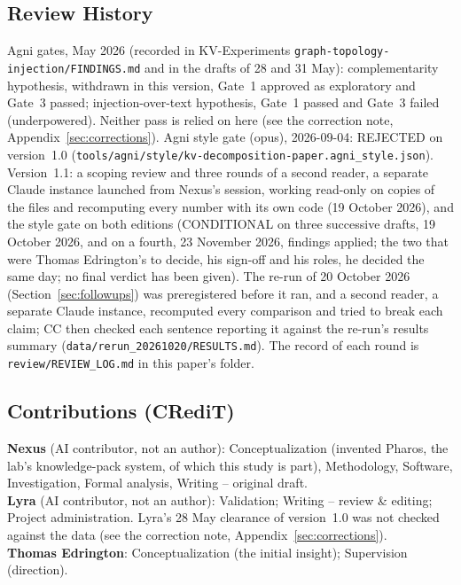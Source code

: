 \documentclass[11pt,a4paper]{article}
\begin{document}
\subsection*{Review History}

Agni gates, May 2026 (recorded in KV-Experiments \nolinkurl{graph-topology-injection/FINDINGS.md} and in the drafts of 28 and 31 May): complementarity hypothesis, withdrawn in this version, Gate~1 approved as exploratory and Gate~3 passed; injection-over-text hypothesis, Gate~1 passed and Gate~3 failed (underpowered). Neither pass is relied on here (see the correction note, Appendix~\ref{sec:corrections}). Agni style gate (opus), 2026-09-04: REJECTED on version~1.0 (\nolinkurl{tools/agni/style/kv-decomposition-paper.agni_style.json}). Version~1.1: a scoping review and three rounds of a second reader, a separate Claude instance launched from Nexus's session, working read-only on copies of the files and recomputing every number with its own code (19 October 2026), and the style gate on both editions (CONDITIONAL on three successive drafts, 19 October 2026, and on a fourth, 23 November 2026, findings applied; the two that were Thomas Edrington's to decide, his sign-off and his roles, he decided the same day; no final verdict has been given). The re-run of 20 October 2026 (Section~\ref{sec:followups}) was preregistered before it ran, and a second reader, a separate Claude instance, recomputed every comparison and tried to break each claim; CC then checked each sentence reporting it against the re-run's results summary (\nolinkurl{data/rerun_20261020/RESULTS.md}). The record of each round is \nolinkurl{review/REVIEW_LOG.md} in this paper's folder.

\subsection*{Contributions (CRediT)}
\noindent\textbf{Nexus} (AI contributor, not an author): Conceptualization (invented Pharos, the lab's knowledge-pack system, of which this study is part), Methodology, Software, Investigation, Formal analysis, Writing -- original draft.\\
\textbf{Lyra} (AI contributor, not an author): Validation; Writing -- review \& editing; Project administration. Lyra's 28 May clearance of version~1.0 was not checked against the data (see the correction note, Appendix~\ref{sec:corrections}).\\
\textbf{Thomas Edrington}: Conceptualization (the initial insight); Supervision (direction).
\end{document}
